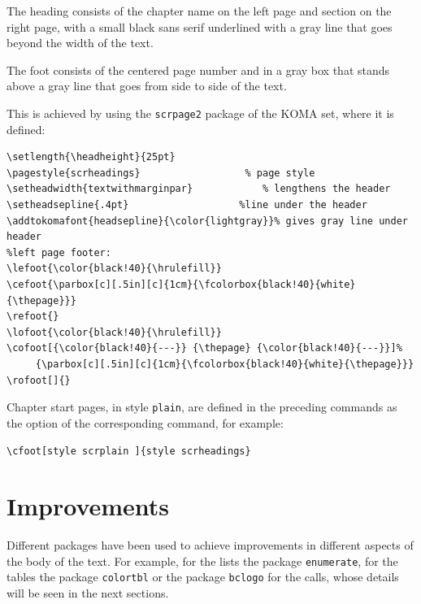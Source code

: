 \documentclass[a4paper,
                             twoside,
                             BCOR1.0cm,
                             DIV11,
                             parskip=full,
                             11pt]{scrbook}
\begin{document}
\begin{objectives}%
\item  The heading consists of the chapter name on the left page and section on the right page, with a small black sans serif underlined with a gray line that goes beyond the width of the text.
\item  The foot consists of the centered page number and in a gray box that stands above a gray line that goes from side to side of the text.
\end{objectives}
This is achieved by using the \verb+scrpage2+ package of the KOMA set, where it is defined:
\begin{tiny}
\begin{verbatim}
\setlength{\headheight}{25pt}	      		   
\pagestyle{scrheadings}			         % page style
\setheadwidth{textwithmarginpar}	    	% lengthens the header
\setheadsepline{.4pt}					%line under the header
\addtokomafont{headsepline}{\color{lightgray}}% gives gray line under header
%left page footer:
\lefoot{\color{black!40}{\hrulefill}}
\cefoot{\parbox[c][.5in][c]{1cm}{\fcolorbox{black!40}{white}{\thepage}}}
\refoot{}
\lofoot{\color{black!40}{\hrulefill}}
\cofoot[{\color{black!40}{---}} {\thepage} {\color{black!40}{---}}]%
     {\parbox[c][.5in][c]{1cm}{\fcolorbox{black!40}{white}{\thepage}}}
\rofoot[]{}
\end{verbatim}
\end{tiny}
Chapter start pages, in style \verb+plain+, are defined in the preceding commands as the option of the corresponding command, for example:
\begin{scriptsize}\verb+\cfoot[style scrplain ]{style scrheadings}+\end{scriptsize}


\chapter{Improvements}\label{cap:improvements}

Different packages have been used to achieve improvements in different aspects of the body of the text. For example, for the lists the package \verb+enumerate+, for the tables the package \verb+colortbl+ or the package \verb+bclogo+ for the calls, whose details will be seen in the next sections.

\end{document}
